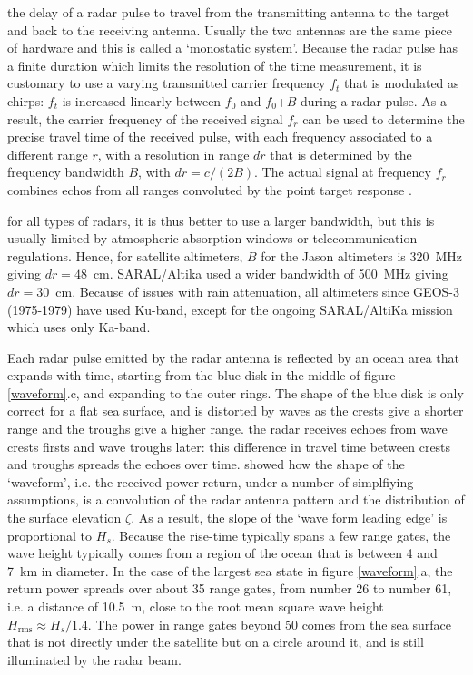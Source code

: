 the delay of a radar pulse 
to travel from the transmitting antenna to the target and back to the receiving antenna. Usually the two antennas are the same piece of hardware 
and this is called a `monostatic system'. Because the radar pulse has a finite duration which limits the resolution of the time measurement, 
it is customary to use a varying transmitted carrier frequency $f_t$ that is modulated as chirps: $f_t$ is increased linearly between $f_0$ and $f_0$+$B$ during a radar pulse. As a result, the carrier frequency of the received signal $f_r$ can be used to determine the precise travel time of the received pulse, with each frequency associated to a different range $r$, with a resolution in range $dr$ that is determined by the frequency bandwidth $B$, with $dr=c /(2B)$. The actual signal at frequency $f_r$ combines echos from all ranges convoluted by the point target response \citep[e.g.][]{Halimi2013}.  

for all types of radars, it is thus better to use a larger bandwidth, 
but this is usually limited by atmospheric absorption windows or telecommunication regulations. Hence, for satellite altimeters, $B$ for the Jason altimeters is 320~MHz  
giving $dr=48$~cm. SARAL/Altika used a wider bandwidth of  
500~MHz  giving $dr=30$~cm. Because of issues with rain attenuation, all altimeters since GEOS-3 (1975-1979) have used Ku-band, except for the ongoing SARAL/AltiKa mission which uses only Ka-band.

Each radar pulse emitted by the radar antenna is reflected by an ocean area that expands with time, starting from the blue disk in the middle of figure \ref{waveform}.c, and 
expanding to the outer rings. The shape of the blue disk is only correct for a flat sea surface, and is distorted by waves as the crests give a shorter range and the troughs give a higher range. 
the radar receives echoes from wave crests firsts and wave troughs later: this difference in travel time between crests and troughs  
spreads the echoes over time. \cite{Brown1977} showed how the shape of the `waveform',  i.e. the received power return, under a number 
of simplfiying assumptions, is a convolution 
of the radar antenna pattern and the distribution of the surface elevation $\zeta$. As a result, 
the slope of the `wave form leading edge' is proportional to  $H_s$.  Because 
the rise-time typically spans a few range gates, the wave height typically comes from a region of the ocean that is between 4 and 7~km in diameter. 
In the case of the largest sea state in figure \ref{waveform}.a, the return 
power spreads over about 35 range gates, from number 26 to number 61, i.e. a distance of 10.5~m, close to the root mean square wave height
 $H_{\mathrm{rms}} \approx  H_{s}/1.4$. The power in range gates beyond 50 comes from the sea surface that is not directly 
 under the satellite but on a circle around it, and is still illuminated by the radar beam.  

